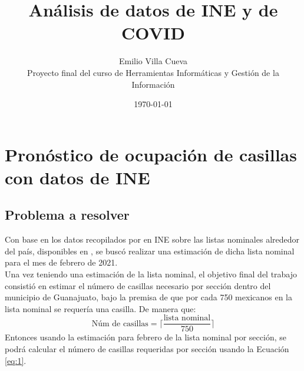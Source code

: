 \documentclass[12pt]{article}
\begin{document}
\title{Análisis de datos de INE y de COVID}
\author{Emilio Villa Cueva\\ Proyecto final del curso de Herramientas Informáticas y Gestión de la Información}
\date{\today}
\maketitle
\tableofcontents
\newpage
\section{Pronóstico de ocupación de casillas con datos de INE}
\subsection{Problema a resolver}
Con base en los datos recopilados por en INE sobre las listas nominales alrededor del país, disponibles en \cite{ine}, se buscó realizar una estimación de dicha lista nominal para el mes de febrero de 2021. \\
Una vez teniendo una estimación de la lista nominal, el objetivo final del trabajo consistió en estimar el número de casillas necesario por sección dentro del municipio de Guanajuato, bajo la premisa de que por cada 750 mexicanos en la lista nominal se requería una casilla. De manera que:
\begin{equation}
\text{Núm de casillas}=\lceil{\frac{\text{lista nominal}}{750}}\rceil
    \label{eq:1}
\end{equation}
Entonces usando la estimación para febrero de la lista nominal por sección, se podrá calcular el número de casillas requeridas por sección usando la Ecuación \ref{eq:1}. 
\end{document}
